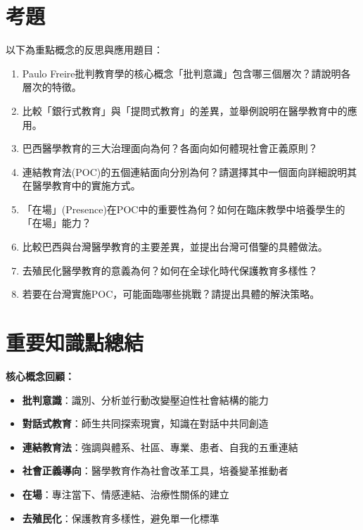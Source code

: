 \documentclass[12pt,a4paper]{article}
\begin{document}
\section{考題}

以下為重點概念的反思與應用題目：

\begin{enumerate}
    \item Paulo Freire批判教育學的核心概念「批判意識」包含哪三個層次？請說明各層次的特徵。
    
    \item 比較「銀行式教育」與「提問式教育」的差異，並舉例說明在醫學教育中的應用。
    
    \item 巴西醫學教育的三大治理面向為何？各面向如何體現社會正義原則？
    
    \item 連結教育法(POC)的五個連結面向分別為何？請選擇其中一個面向詳細說明其在醫學教育中的實施方式。
    
    \item 「在場」(Presence)在POC中的重要性為何？如何在臨床教學中培養學生的「在場」能力？
    
    \item 比較巴西與台灣醫學教育的主要差異，並提出台灣可借鑒的具體做法。
    
    \item 去殖民化醫學教育的意義為何？如何在全球化時代保護教育多樣性？
    
    \item 若要在台灣實施POC，可能面臨哪些挑戰？請提出具體的解決策略。
\end{enumerate}

\section{重要知識點總結}

\begin{importantbox}
\textbf{核心概念回顧：}
\begin{itemize}[nosep]
    \item \textbf{批判意識}：識別、分析並行動改變壓迫性社會結構的能力
    \item \textbf{對話式教育}：師生共同探索現實，知識在對話中共同創造
    \item \textbf{連結教育法}：強調與體系、社區、專業、患者、自我的五重連結
    \item \textbf{社會正義導向}：醫學教育作為社會改革工具，培養變革推動者
    \item \textbf{在場}：專注當下、情感連結、治療性關係的建立
    \item \textbf{去殖民化}：保護教育多樣性，避免單一化標準
\end{itemize}
\end{importantbox}
\end{document}
